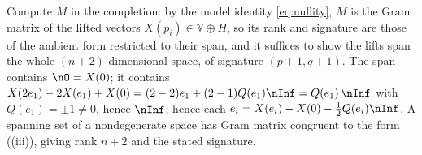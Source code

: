 Compute $M$ in the completion: by the model identity \eqref{eq:nullity}, $M$ is the Gram matrix of the lifted vectors $X(p_i) \in \mathbb{V} \oplus H$, so its rank and signature are those of the ambient form restricted to their span, and it suffices to show the lifts span the whole $(n{+}2)$-dimensional space, of signature $(p{+}1, q{+}1)$. The span contains $\nO = X(0)$; it contains $X(2e_1) - 2X(e_1) + X(0) = (2 - 2)e_1 + (2 - 1)Q(e_1)\nInf = Q(e_1)\,\nInf$ with $Q(e_1) = \pm 1 \neq 0$, hence $\nInf$; hence each $e_i = X(e_i) - X(0) - \tfrac12 Q(e_i)\nInf$. A spanning set of a nondegenerate space has Gram matrix congruent to the form ((iii)), giving rank $n+2$ and the stated signature.
